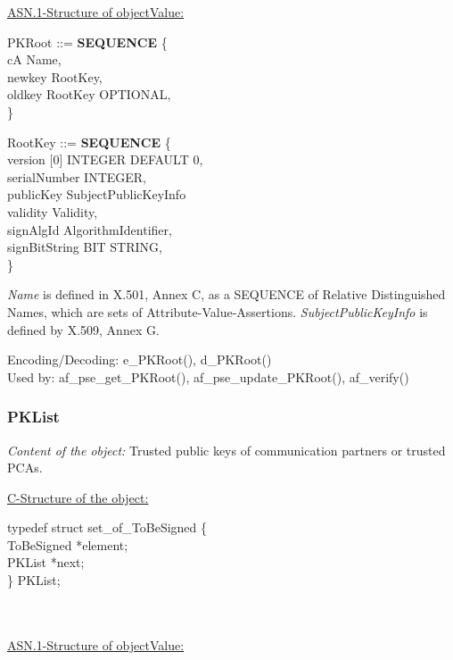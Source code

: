 \underline{ASN.1-Structure of objectValue:}

{\small
\bvtab
\3 PKRoot ::= \3 {\bf SEQUENCE} \{     \\
\7 cA                \2 Name,                 \\
\7 newkey            \2 RootKey,              \\
\7 oldkey            \2 RootKey OPTIONAL,     \\
\6 \}
\evtab

\bvtab
\3 RootKey ::= \3 {\bf SEQUENCE} \{     \\
\5 version [0]          \5 INTEGER DEFAULT 0,          \\
\5 serialNumber         \5 INTEGER,                    \\
\5 publicKey            \5 SubjectPublicKeyInfo        \\
\5 validity             \5 Validity,                   \\
\5 signAlgId            \5 AlgorithmIdentifier,        \\
\5 signBitString        \5 BIT STRING,                 \\
\4 \}
\evtab
}
 
{\em Name} is defined in X.501, Annex C,
as a SEQUENCE of Relative Distinguished Names,
which are sets of Attribute-Value-Assertions.
{\em SubjectPublicKeyInfo} is defined by X.509, Annex G.


Encoding/Decoding: e\_PKRoot(), d\_PKRoot() \\
Used by: af\_pse\_get\_PKRoot(), af\_pse\_update\_PKRoot(), af\_verify()

\subsubsection{PKList}
{\em Content of the object:} Trusted public keys of communication partners or trusted PCAs.
 
\underline{C-Structure of the object:}

{\small
\bvtab
\4      typedef struct set\_of\_ToBeSigned \{ \\
\6              ToBeSigned   \3 *element; \\
\6              PKList       \3 *next; \\
\4      \} PKList; \\ \\ \\
\evtab
}


\underline{ASN.1-Structure of objectValue:}

